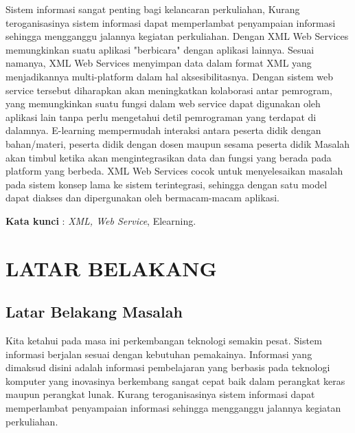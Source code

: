 \documentclass{jtetiproposalskripsi}
\begin{document}
\cover

\approvalpage


\begin{abstractind}
Sistem informasi sangat penting bagi kelancaran perkuliahan, Kurang teroganisasinya sistem informasi dapat memperlambat penyampaian informasi sehingga mengganggu jalannya kegiatan  perkuliahan. Dengan XML Web Services memungkinkan suatu aplikasi "berbicara" dengan aplikasi lainnya. Sesuai namanya,  XML Web Services  menyimpan data dalam format XML yang menjadikannya multi-platform  dalam hal aksesibilitasnya. Dengan sistem  web service  tersebut diharapkan akan meningkatkan kolaborasi antar pemrogram, yang memungkinkan suatu fungsi dalam web service  dapat digunakan oleh aplikasi lain tanpa perlu mengetahui detil pemrograman yang terdapat di dalamnya.  E-learning mempermudah interaksi antara peserta didik dengan bahan/materi, peserta didik dengan dosen maupun sesama peserta didik Masalah akan timbul ketika akan mengintegrasikan data dan fungsi yang berada pada  platform yang berbeda. XML Web Services  cocok untuk menyelesaikan masalah pada sistem konsep lama ke sistem terintegrasi, sehingga dengan satu model dapat diakses dan dipergunakan oleh bermacam-macam aplikasi.

\bigskip
\textbf{Kata kunci} : \emph{XML, Web Service}, Elearning.
\end{abstractind}

\tableofcontents
{}
\clearpage{}\setcounter{page}{1}

\chapter{LATAR BELAKANG}

\section{Latar Belakang Masalah}
Kita ketahui pada masa ini perkembangan teknologi semakin pesat. Sistem informasi berjalan sesuai dengan kebutuhan pemakainya. Informasi yang dimaksud disini adalah informasi pembelajaran yang berbasis pada teknologi komputer yang inovasinya berkembang sangat cepat baik dalam perangkat keras maupun perangkat lunak. Kurang teroganisasinya sistem informasi dapat memperlambat penyampaian informasi sehingga mengganggu jalannya kegiatan  perkuliahan.
\end{document}
